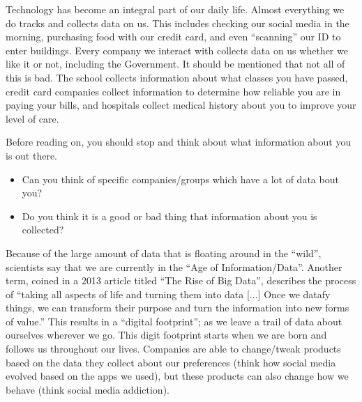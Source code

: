 \documentclass[
  letterpaper,
  DIV=11,
  numbers=noendperiod]{scrreprt}
\providecommand{\tightlist}{%
  \setlength{\itemsep}{0pt}\setlength{\parskip}{0pt}}
\begin{document}
Technology has become an integral part of our daily life. Almost
everything we do tracks and collects data on us. This includes checking
our social media in the morning, purchasing food with our credit card,
and even ``scanning'' our ID to enter buildings. Every company we
interact with collects data on us whether we like it or not, including
the Government. It should be mentioned that not all of this is bad. The
school collects information about what classes you have passed, credit
card companies collect information to determine how reliable you are in
paying your bills, and hospitals collect medical history about you to
improve your level of care.

\begin{tcolorbox}[enhanced jigsaw, leftrule=.75mm, arc=.35mm, coltitle=black, rightrule=.15mm, bottomrule=.15mm, toprule=.15mm, left=2mm, colbacktitle=quarto-callout-note-color!10!white, title=\textcolor{quarto-callout-note-color}{\faInfo}\hspace{0.5em}{Reflection}, toptitle=1mm, breakable, colframe=quarto-callout-note-color-frame, bottomtitle=1mm, titlerule=0mm, colback=white, opacityback=0, opacitybacktitle=0.6]

Before reading on, you should stop and think about what information
about you is out there.

\begin{itemize}
\tightlist
\item
  Can you think of specific companies/groups which have a lot of data
  bout you?
\item
  Do you think it is a good or bad thing that information about you is
  collected?
\end{itemize}

\end{tcolorbox}

Because of the large amount of data that is floating around in the
``wild'', scientists say that we are currently in the ``Age of
Information/Data''. Another term, coined in a 2013 article titled ``The
Rise of Big Data'', describes the process of ``taking all aspects of
life and turning them into data {[}\(\dots\){]} Once we datafy things,
we can transform their purpose and turn the information into new forms
of value.'' This results in a ``digital footprint''; as we leave a trail
of data about ourselves wherever we go. This digit footprint starts when
we are born and follows us throughout our lives. Companies are able to
change/tweak products based on the data they collect about our
preferences (think how social media evolved based on the apps we used),
but these products can also change how we behave (think social media
addiction).
\end{document}
